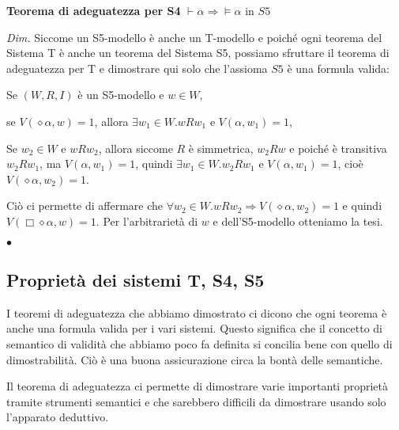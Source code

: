 \documentclass[a4paper, 12pt]{article}
\begin{document}
\begin{flushleft}
\textbf{Teorema di adeguatezza per S4}
$\vdash \alpha \Rightarrow \vDash \alpha$ in $S5$

\textit{Dim.}
Siccome un S5-modello è anche un T-modello e poiché ogni teorema del Sistema T
è anche un teorema del Sistema S5, possiamo sfruttare il teorema di adeguatezza per T
e dimostrare qui solo che l'assioma $S5$ è una formula valida:

Se $(W, R, I)$ è un S5-modello e $w \in W$,

se $V(\diamond \alpha, w) = 1$, allora $\exists w_1 \in W. wRw_1$ e $V(\alpha, w_1) = 1$,

Se $w_2 \in W$ e $wRw_2$, allora siccome $R$ è simmetrica, $w_2Rw$ e poiché
è transitiva $w_2Rw_1$, ma $V(\alpha, w_1) = 1$, quindi
$\exists w_1 \in W. w_2Rw_1$ e $V(\alpha, w_1) = 1$, cioè $V(\diamond \alpha, w_2) = 1$.

Ciò ci permette di affermare che $\forall w_2 \in W. wRw_2 \Rightarrow V(\diamond \alpha, w_2) = 1$
e quindi $V(\Box \diamond \alpha, w) = 1$.
Per l'arbitrarietà di $w$ e dell'S5-modello otteniamo la tesi.

\begin{flushright}
$\bullet$
\end{flushright}
\end{flushleft}

\subsection{Proprietà dei sistemi T, S4, S5}
I teoremi di adeguatezza che abbiamo dimostrato ci dicono che ogni teorema
è anche una formula valida per i vari sistemi.
Questo significa che il concetto di semantico di validità che abbiamo poco fa definita
si concilia bene con quello di dimostrabilità. Ciò è una buona assicurazione circa
la bontà delle semantiche.

Il teorema di adeguatezza ci permette di dimostrare varie importanti proprietà tramite
strumenti semantici e che sarebbero difficili da dimostrare usando solo l'apparato deduttivo.
\end{document}
